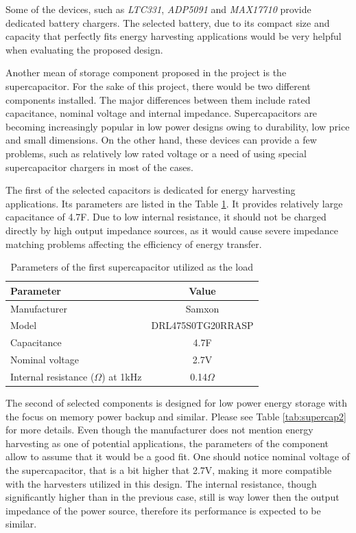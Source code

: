 \documentclass[12pt,a4paper]{article}
\begin{document}
Some of the devices, such as \textit{LTC331}, \textit{ADP5091} and \textit{MAX17710} provide dedicated battery chargers. The selected battery, due to its compact size and capacity that perfectly fits energy harvesting applications would be very helpful when evaluating the proposed design.
\par
Another mean of storage component proposed in the project is the supercapacitor. For the sake of this project, there would be two different components installed. The major differences between them include rated capacitance, nominal voltage and internal impedance. Supercapacitors are becoming increasingly popular in low power designs owing to durability, low price and small dimensions. On the other hand, these devices can provide a few problems, such as relatively low rated voltage or a need of using special supercapacitor chargers in most of the cases.
\par

The first of the selected capacitors is dedicated for energy harvesting applications. Its parameters are listed in the Table \ref{tab:supercap1}. It provides relatively large capacitance of 4.7F. Due to low internal resistance, it should not be charged directly by high output impedance sources, as it would cause severe impedance matching problems affecting the efficiency of energy transfer.

\begin{table}[ht!]
\begin{tabular}{|l|c|}
\hline
\textbf{Parameter}              & \textbf{Value} \\ \hline
Manufacturer & Samxon          \\ \hline
Model                 & DRL475S0TG20RRASP \\ \hline
Capacitance                & 4.7F         \\ \hline
Nominal voltage     & 2.7V           \\ \hline
Internal resistance ($\Omega$) at 1kHz     & 0.14$\Omega$ \\ \hline
\end{tabular}
\caption{Parameters of the first supercapacitor utilized as the load \cite{supercap2params} }
\label{tab:supercap1}
\end{table}
\par
The second of selected components is designed for low power energy storage with the focus on memory power backup and similar. Please see Table \ref{tab:supercap2} for more details. Even though the manufacturer does not mention energy harvesting as one of potential applications, the parameters of the component allow to assume that it would be a good fit. One should notice nominal voltage of the supercapacitor, that is a bit higher that 2.7V, making it more compatible with the harvesters utilized in this design. The internal resistance, though significantly higher than in the previous case, still is way lower then the output impedance of the power source, therefore its performance is expected to be similar. 
\end{document}
